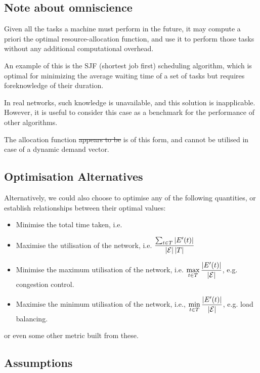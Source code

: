 \documentclass{amsart}
\begin{document}
    \subsection{Note about omniscience}

    Given all the tasks a machine must perform in the future, it may compute a priori the optimal resource-allocation function, and use it to perform those tasks without any additional computational overhead. 
    
    An example of this is the SJF (shortest job first) scheduling algorithm, which is optimal for minimizing the average waiting time of a set of tasks but requires foreknowledge of their duration.

    In real networks, such knowledge is unavailable, and this solution is inapplicable. However, it is useful to consider this case as a benchmark for the performance of other algorithms.

    The allocation function \sout{appears to be} is of this form, and cannot be utilised in case of a dynamic demand vector.

    \subsection{Optimisation Alternatives}

    Alternatively, we could also choose to optimise any of the following quantities, or establish relationships between their optimal values: \begin{itemize}
        \item Minimise the total time taken, i.e. 
        \item Maximise the utilisation of the network, i.e. \(\displaystyle \frac{\sum_{t \in T} \left|E'(t)\right|}{\left|\mathcal{E}\right| \left|T\right|}\)
        \item Minimise the maximum utilisation of the network, i.e. \(\displaystyle \max_{t \in T} \frac{\left|E'(t)\right|}{\left|\mathcal{E}\right|}\), e.g. congestion control.
        \item Maximise the minimum utilisation of the network, i.e., \(\displaystyle \min_{t \in T} \frac{\left|E'(t)\right|}{\left|\mathcal{E}\right|}\), e.g. load balancing.
    \end{itemize}

    or even some other metric built from these.

    \subsection{Assumptions}
\end{document}
